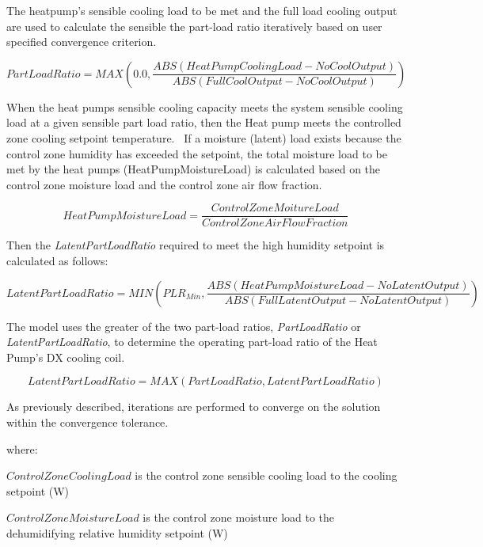 The heatpump's sensible cooling load to be met and the full load cooling output are used to calculate the sensible the part-load ratio iteratively based on user specified convergence criterion.

\begin{equation}
PartLoadRatio = MAX\left( {0.0,\frac{{ABS\left( {HeatPumpCoolingLoad - NoCoolOutput} \right)}}{{ABS\left( {FullCoolOutput - NoCoolOutput} \right)}}} \right)
\end{equation}

When the heat pumps sensible cooling capacity meets the system sensible cooling load at a given sensible part load ratio, then the Heat pump meets the controlled zone cooling setpoint temperature.~ If a moisture (latent) load exists because the control zone humidity has exceeded the setpoint, the total moisture load to be met by the heat pumps (HeatPumpMoistureLoad) is calculated based on the control zone moisture load and the control zone air flow fraction.

\begin{equation}
HeatPumpMoistureLoad = \frac{{ControlZoneMoitureLoad}}{{ControlZoneAirFlowFraction}}
\end{equation}

Then the \emph{LatentPartLoadRatio} required to meet the high humidity setpoint is calculated as follows:

\begin{equation}
LatentPartLoadRatio = MIN\left( {PL{R_{Min}},\frac{{ABS\left( {HeatPumpMoistureLoad - NoLatentOutput} \right)}}{{ABS\left( {FullLatentOutput - NoLatentOutput} \right)}}} \right)
\end{equation}

The model uses the greater of the two part-load ratios, \emph{PartLoadRatio} or \emph{LatentPartLoadRatio}, to determine the operating part-load ratio of the Heat Pump's DX cooling coil.

\begin{equation}
LatentPartLoadRatio = MAX\left( {PartLoadRatio,LatentPartLoadRatio} \right)
\end{equation}

As previously described, iterations are performed to converge on the solution within the convergence tolerance.

where:

\(ControlZoneCoolingLoad\) is the control zone sensible cooling load to the cooling setpoint (W)

\(ControlZoneMoistureLoad\) is the control zone moisture load to the dehumidifying relative humidity setpoint (W)

